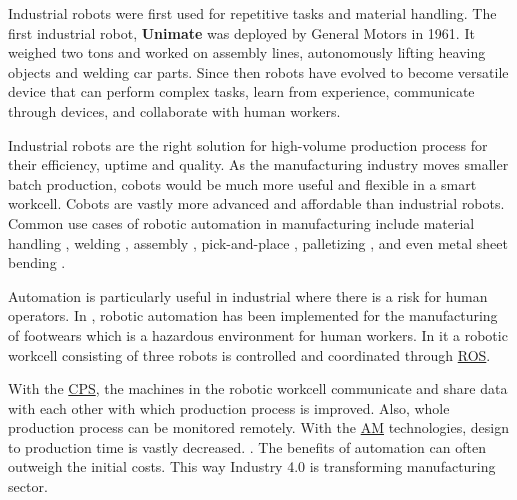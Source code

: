 Industrial robots were first used for repetitive tasks and material handling.
The first industrial robot, \textbf{Unimate} was deployed by General Motors in 1961. It weighed two tons and worked on assembly lines, autonomously lifting heaving objects and welding car parts. 
Since then robots have evolved to become versatile device that can perform complex tasks, learn from experience, communicate through devices, and collaborate with human workers. \cite{firstrobot}

Industrial robots are the right solution for high-volume production process for their efficiency, uptime and quality. \cite{jrautomation} As the manufacturing industry moves smaller batch production, cobots would be much more useful and flexible in a smart workcell. Cobots are vastly more advanced and affordable than industrial robots. \cite{jrautomation2}
Common use cases of robotic automation in manufacturing include material handling \cite{gambao2012new,SKIBNIEWSKI1992251}, welding \cite{tarn2011robotic}, assembly \cite{ji2021learning}, pick-and-place \cite{shah2021design}, palletizing \cite{lee2021intelligent}, and even metal sheet bending \cite{Uhrhan1995}.

Automation is particularly useful in industrial where there is a risk for human operators.
In \cite{10381692}, robotic automation has been implemented for the manufacturing of footwears which is a hazardous environment for human workers.
In it a robotic workcell consisting of three robots is controlled and coordinated through \hyperref[acro:ROS]{ROS}.

With the \hyperref[acro:CPS]{CPS}, the machines in the robotic workcell communicate and share data with each other with which production process is improved. Also, whole production process
can be monitored remotely.\cite[page 105]{li2020robotics} With the \hyperref[acro:AM]{AM} technologies, design to production time is vastly decreased. \cite[page 116]{li2020robotics}. The benefits of automation can often outweigh the initial costs. This way Industry 4.0 is transforming manufacturing sector. 


